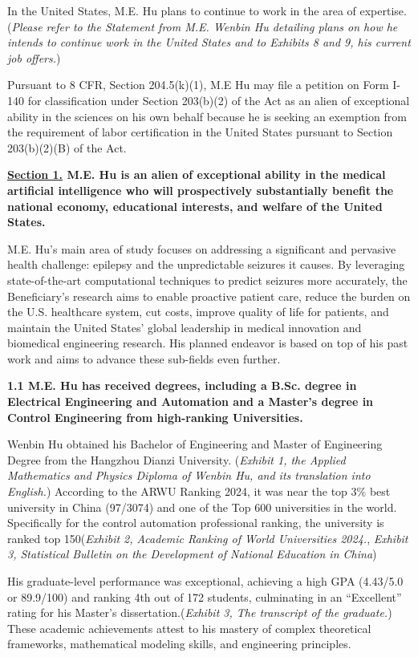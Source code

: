 \documentclass{article}
\begin{document}
In the United States, M.E. Hu plans to continue to work in the area of expertise. ({\it Please refer to the Statement from M.E. Wenbin Hu detailing plans on how he intends to continue work in the United States and to Exhibits 8 and 9, his current job offers.})

Pursuant to 8 CFR, Section 204.5(k)(1), M.E Hu may file a petition on Form I-140 for classification under Section 203(b)(2) of the Act as an alien of exceptional ability in the sciences on his own behalf because he is seeking an exemption from the requirement of labor certification in the United States pursuant to Section 203(b)(2)(B) of the Act.

\clearpage

{\bf \underline{Section 1.} M.E. Hu is an alien of exceptional ability in the medical artificial intelligence who will prospectively substantially benefit the national economy, educational interests, and welfare of the United States.}

M.E. Hu's main area of study focuses on addressing a significant and pervasive health challenge: epilepsy and the unpredictable seizures it causes. By leveraging state-of-the-art computational techniques to predict seizures more accurately, the Beneficiary’s research aims to enable proactive patient care, reduce the burden on the U.S. healthcare system, cut costs, improve quality of life for patients, and maintain the United States’ global leadership in medical innovation and biomedical engineering research. His planned endeavor is based on top of his past work and aims to advance these sub-fields even further.

 
{\bf 1.1 M.E. Hu has received degrees, including a B.Sc. degree in Electrical Engineering and Automation and a Master’s degree in Control Engineering  from high-ranking Universities. }

Wenbin Hu obtained his Bachelor of Engineering and Master of Engineering Degree from the Hangzhou Dianzi University. ({\it Exhibit 1, the Applied Mathematics and Physics Diploma of Wenbin Hu, and its translation into English.}) According to the ARWU Ranking 2024, it was near the top 3\%  best university in China (97/3074) and one of the Top 600 universities in the world. Specifically for the control automation professional ranking, the university is ranked top 150({\it Exhibit 2, Academic Ranking of World Universities 2024.}, {\it Exhibit 3, Statistical Bulletin on the Development of National Education in  China}) 

His graduate-level performance was exceptional, achieving a high GPA (4.43/5.0 or 89.9/100) and ranking 4th out of 172 students, culminating in an “Excellent” rating for his Master’s dissertation.({\it Exhibit 3, The transcript of the graduate.}) These academic achievements attest to his mastery of complex theoretical frameworks, mathematical modeling skills, and engineering principles.
\end{document}
